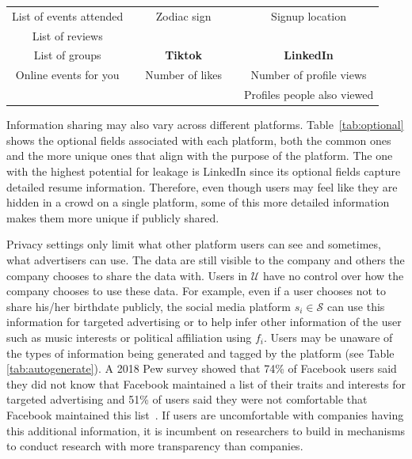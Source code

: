 \documentclass[11pt]{article} %
\begin{document}
\begin{table}[tb]
\begin{subtable}{\textwidth}
\begin{tabular}{ccccc}
List of events attended &  & Zodiac sign     &  & Signup location             \\
List of reviews         &  &                 &  &                             \\
List of groups          &  & \textbf{Tiktok}          &  & \textbf{LinkedIn}                    \\ \cline{3-3} \cline{5-5} 
Online events for you   &  & Number of likes &  & Number of profile views     \\
                        &  &                 &  & Profiles people also viewed     
        \end{tabular} 
    \end{subtable}
\end{table}
Information sharing may also vary across different platforms. Table~\ref{tab:optional} shows the optional fields associated with each platform, both the common ones and the more unique ones that align with the purpose of the platform. 
The one with the highest potential for leakage is LinkedIn since its optional fields capture detailed resume information. Therefore, even though users may feel like they are hidden in a crowd on a single platform, some of this more detailed information makes them more unique if publicly shared. 

Privacy settings only limit what other platform users can see and sometimes, what advertisers can use. The data are still visible to the company and others the company chooses to share the data with. Users in $\mathcal{U}$ have no control over how the company chooses to use these data. For example, even if a user chooses not to share his/her birthdate publicly, the social media platform $s_i \in \mathcal{S}$ can use this information for targeted advertising or to help infer other information of the user such as music interests or political affiliation using $f_i$. Users may be unaware of the types of information being generated and tagged by the platform (see Table \ref{tab:autogenerate}). A 2018 Pew survey showed that 74\% of Facebook users said they did not know that Facebook maintained a list of their traits and interests for targeted advertising and 51\% of users said they were not comfortable that Facebook maintained this list~\cite{FB_targetad}. If users are uncomfortable with companies having this additional information, it is incumbent on researchers to build in mechanisms to conduct research with more transparency than companies. 
\end{document}
